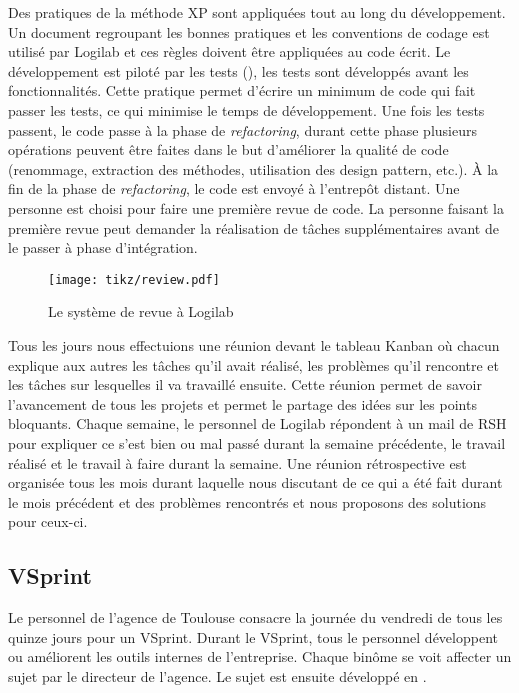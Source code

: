 Des pratiques de la méthode XP sont appliquées tout au long du développement. Un document regroupant les bonnes pratiques et les conventions de codage est utilisé par Logilab et ces règles doivent être appliquées au code écrit. Le développement est piloté par les tests (), les tests sont développés avant les fonctionnalités. Cette pratique permet d'écrire un minimum de code qui fait passer les tests, ce qui minimise le temps de développement. Une fois les tests passent, le code passe à la phase de \textit{refactoring}, durant cette phase plusieurs opérations peuvent être faites dans le but d'améliorer la qualité de code (renommage, extraction des méthodes, utilisation des design pattern, etc.). \`A la fin de la phase de \textit{refactoring}, le code est envoyé à l’entrepôt distant. Une personne est choisi pour faire une première revue de code. La personne faisant la première revue peut demander la réalisation de tâches supplémentaires avant de le passer à phase d'intégration. 

\begin{figure}
\centering
  \texttt{[image: tikz/review.pdf]}
  \caption{Le système de revue à Logilab}
  \label{fig:review}
\end{figure}

Tous les jours nous effectuions une réunion devant le tableau Kanban où chacun explique aux autres les tâches qu'il avait réalisé, les problèmes qu'il rencontre et les tâches sur lesquelles il va travaillé ensuite. Cette réunion permet de savoir l'avancement de tous les projets et permet le partage des idées sur les points bloquants. Chaque semaine, le personnel de Logilab répondent à un mail de RSH pour expliquer ce s'est bien ou mal passé durant la semaine précédente, le travail réalisé et le travail à faire durant la semaine. Une réunion rétrospective est organisée tous les mois durant laquelle nous discutant de ce qui a été fait durant le mois précédent et des problèmes rencontrés et nous proposons des solutions pour ceux-ci. 

\subsection{VSprint}
Le personnel de l'agence de Toulouse consacre la journée du vendredi de tous les quinze jours pour un VSprint. Durant le VSprint, tous le personnel développent ou améliorent les outils internes de l'entreprise. Chaque binôme se voit affecter un sujet par le directeur de l'agence. Le sujet est ensuite développé en .

